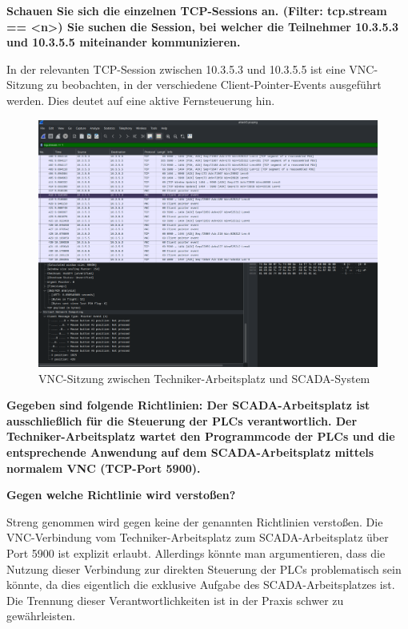 \documentclass[
    a4paper,
    pagesize,
	pdftex,
    12pt,
]{scrartcl}
\begin{document}
\textbf{Schauen Sie sich die einzelnen TCP-Sessions an. (Filter: tcp.stream == <n>) Sie suchen die Session, bei welcher die Teilnehmer 10.3.5.3 und 10.3.5.5 miteinander kommunizieren.}

In der relevanten TCP-Session zwischen 10.3.5.3 und 10.3.5.5 ist eine VNC-Sitzung zu beobachten, in der verschiedene Client-Pointer-Events ausgeführt werden. Dies deutet auf eine aktive Fernsteuerung hin.

\begin{figure}[H]
    \centering
    \includegraphics[width=\textwidth]{ws-vnc-session.png}
    \caption{VNC-Sitzung zwischen Techniker-Arbeitsplatz und SCADA-System}
    \label{fig:ws-vnc-session}
\end{figure}

\textbf{Gegeben sind folgende Richtlinien:
Der SCADA-Arbeitsplatz ist ausschließlich für die Steuerung der PLCs verantwortlich.
Der Techniker-Arbeitsplatz wartet den Programmcode der PLCs und die entsprechende Anwendung auf dem SCADA-Arbeitsplatz mittels normalem VNC (TCP-Port 5900).}

\textbf{Gegen welche Richtlinie wird verstoßen?}

Streng genommen wird gegen keine der genannten Richtlinien verstoßen. Die VNC-Verbindung vom Techniker-Arbeitsplatz zum SCADA-Arbeitsplatz über Port 5900 ist explizit erlaubt. Allerdings könnte man argumentieren, dass die Nutzung dieser Verbindung zur direkten Steuerung der PLCs problematisch sein könnte, da dies eigentlich die exklusive Aufgabe des SCADA-Arbeitsplatzes ist. Die Trennung dieser Verantwortlichkeiten ist in der Praxis schwer zu gewährleisten.
\end{document}
